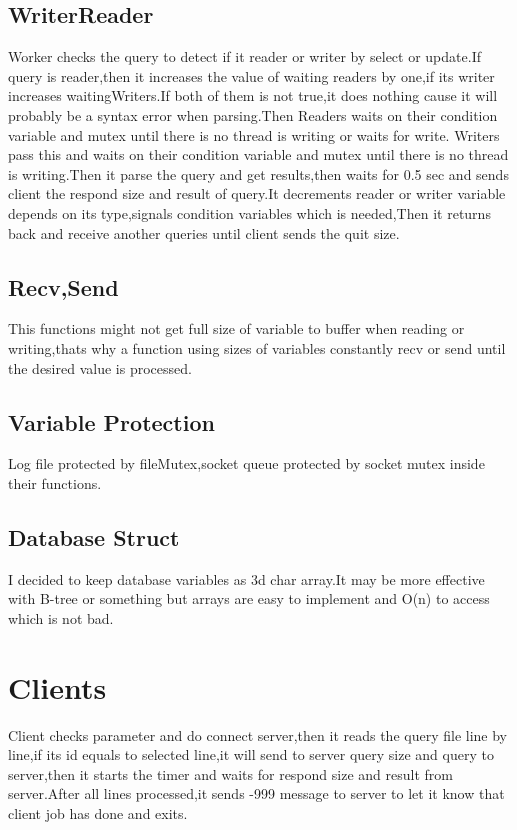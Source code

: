 \documentclass{article}
\begin{document}
\subsection{WriterReader}
Worker checks the query to detect if it reader or writer by select or update.If query is reader,then it increases the value of waiting readers by one,if its writer increases waitingWriters.If both of them is not true,it does nothing cause it will probably be a syntax error when parsing.Then
Readers waits on their condition variable and mutex until there is no thread is writing or waits for write.
Writers pass this and waits on their condition variable and mutex until there is no thread is writing.Then it parse the query and get results,then waits for 0.5 sec and sends client the respond size and result of query.It decrements reader or writer variable depends on its type,signals condition variables which is needed,Then it returns back and receive another queries until client sends the quit size.
\subsection{Recv,Send}
    This functions might not get full size of variable to buffer when reading or writing,thats why a function using sizes of variables constantly recv or send until the desired value is processed.
\subsection{Variable Protection}
Log file protected by fileMutex,socket queue protected by socket mutex inside their functions.
\subsection{Database Struct}
I decided to keep database variables as 3d char array.It may be more effective with B-tree or something but arrays are easy to implement and O(n) to access which is not bad.
\section{Clients}
Client checks parameter and do connect server,then it reads the query file line by line,if its id equals to selected line,it will send to server query size and query to server,then it starts the timer and waits for respond size and result from server.After all lines processed,it sends -999 message to server to let it know that client job has done and exits.
\end{document}

